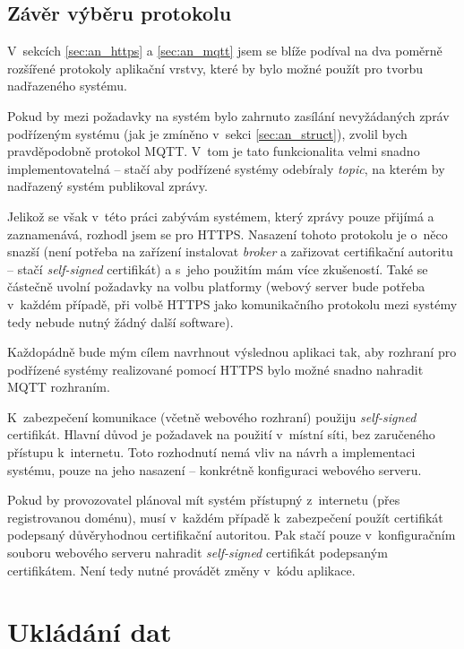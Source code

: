 \subsection{Závěr výběru protokolu}

V~sekcích \ref{sec:an_https} a \ref{sec:an_mqtt} jsem se blíže podíval na dva poměrně rozšířené protokoly aplikační vrstvy, které by bylo možné použít pro tvorbu nadřazeného systému.

Pokud by mezi požadavky na systém bylo zahrnuto zasílání nevyžádaných zpráv podřízeným systému (jak je zmíněno v~sekci \ref{sec:an_struct}), zvolil bych pravděpodobně protokol MQTT. V~tom je tato funkcionalita velmi snadno implementovatelná -- stačí aby podřízené systémy odebíraly \textit{topic}, na kterém by nadřazený systém publikoval zprávy.

Jelikož se však v~této práci zabývám systémem, který zprávy pouze přijímá a zaznamenává, rozhodl jsem se pro HTTPS. Nasazení tohoto protokolu je o~něco snazší (není potřeba na zařízení instalovat \textit{broker} a zařizovat certifikační autoritu -- stačí \textit{self-signed} certifikát) a s~jeho použitím mám více zkušeností. Také se částečně uvolní požadavky na volbu platformy (webový server bude potřeba v~každém případě, při volbě HTTPS jako komunikačního protokolu mezi systémy tedy nebude nutný žádný další software). 

Každopádně bude mým cílem navrhnout výslednou aplikaci tak, aby rozhraní pro podřízené systémy realizované pomocí HTTPS bylo možné snadno nahradit MQTT rozhraním.

K~zabezpečení komunikace (včetně webového rozhraní) použiju \textit{self-signed} certifikát. Hlavní důvod je požadavek na použití v~místní síti, bez zaručeného přístupu k~internetu. Toto rozhodnutí nemá vliv na návrh a implementaci systému, pouze na jeho nasazení -- konkrétně konfiguraci webového serveru.

Pokud by provozovatel plánoval mít systém přístupný z~internetu (přes registrovanou doménu), musí v~každém případě k~zabezpečení použít certifikát podepsaný důvěryhodnou certifikační autoritou. Pak stačí pouze v~konfiguračním souboru webového serveru nahradit \textit{self-signed} certifikát podepsaným certifikátem. Není tedy nutné provádět změny v~kódu aplikace.

\section{Ukládání dat}
\label{sec:an_data}

